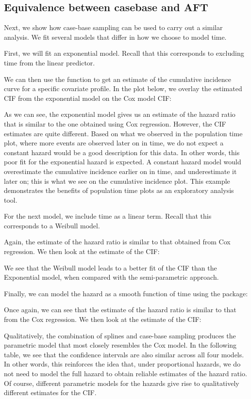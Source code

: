 \documentclass[
]{jss}
\begin{document}
\hypertarget{equivalence-between-casebase-and-aft}{%
\subsection{Equivalence between casebase and
AFT}\label{equivalence-between-casebase-and-aft}}

Next, we show how case-base sampling can be used to carry out a similar
analysis. We fit several models that differ in how we choose to model
time.

First, we will fit an exponential model. Recall that this corresponds to
excluding time from the linear predictor.

We can then use the  function to get an estimate of
the cumulative incidence curve for a specific covariate profile. In the
plot below, we overlay the estimated CIF from the exponential model on
the Cox model CIF:

As we can see, the exponential model gives us an estimate of the hazard
ratio that is similar to the one obtained using Cox regression. However,
the CIF estimates are quite different. Based on what we observed in the
population time plot, where more events are observed later on in time,
we do not expect a constant hazard would be a good description for this
data. In other words, this poor fit for the exponential hazard is
expected. A constant hazard model would overestimate the cumulative
incidence earlier on in time, and underestimate it later on; this is
what we see on the cumulative incidence plot. This example demonstrates
the benefits of population time plots as an exploratory analysis tool.

For the next model, we include time as a linear term. Recall that this
corresponds to a Weibull model.

Again, the estimate of the hazard ratio is similar to that obtained from
Cox regression. We then look at the estimate of the CIF:

We see that the Weibull model leads to a better fit of the CIF than the
Exponential model, when compared with the semi-parametric approach.

Finally, we can model the hazard as a smooth function of time using the
 package:

Once again, we can see that the estimate of the hazard ratio is similar
to that from the Cox regression. We then look at the estimate of the
CIF:

Qualitatively, the combination of splines and case-base sampling
produces the parametric model that most closely resembles the Cox model.
In the following table, we see that the confidence intervals are also
similar across all four models. In other words, this reinforces the idea
that, under proportional hazards, we do not need to model the full
hazard to obtain reliable estimates of the hazard ratio. Of course,
different parametric models for the hazards give rise to qualitatively
different estimates for the CIF.
\end{document}
